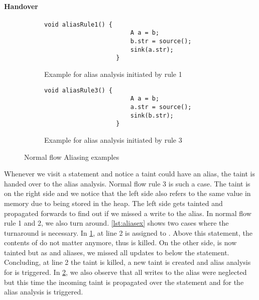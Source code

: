 \documentclass[../draft.tex]{subfiles}
\begin{document}
    \paragraph{Handover}
    \begin{figure}[ht]
        \centering
        \begin{subfigure}[b]{0.45\textwidth}
            \centering
            \begin{adjustbox}{max width=\columnwidth}
                \begin{lstlisting}[gobble=20]
                    void aliasRule1() {
                        A a = b;
                        b.str = source();
                        sink(a.str);
                    }
                \end{lstlisting}
            \end{adjustbox}
            \caption{Example for alias analysis initiated by rule 1}
            \label{lst:aliasex_a}
        \end{subfigure}
        \hfill
        \begin{subfigure}[b]{0.45\textwidth}
            \centering
            \begin{adjustbox}{max width=\columnwidth}
                \begin{lstlisting}[gobble=20]
                    void aliasRule3() {
                        A a = b;
                        a.str = source();
                        sink(b.str);
                    }
                \end{lstlisting}
            \end{adjustbox}
            \caption{Example for alias analysis initiated by rule 3}
            \label{lst:aliasex_b}
        \end{subfigure}
        \caption{Normal flow Aliasing examples}
        \label{lst:aliasex}
    \end{figure}
    Whenever we visit a statement and notice a taint could have an alias, the taint is handed over to the alias analysis. 
    Normal flow rule 3 is such a case. The taint is on the right side and we notice that the left side also refers to the same value in memory due to being stored in the heap. The left side gets tainted and propagated forwards to find out if we missed a write to the alias.
    In normal flow rule 1 and 2, we also turn around. \autoref{lst:aliasex} shows two cases where the turnaround is necessary. In \ref{lst:aliasex_a}, at line 2  is assigned to . Above this statement, the contents of  do not matter anymore, thus  is killed. On the other side,  is now tainted but as  and  aliases, we missed all updates to  below the statement. Concluding, at line 2 the  taint is killed, a new taint  is created and alias analysis for  is triggered.
    In \ref{lst:aliasex_b}, we also observe that all writes to the alias were neglected but this time the incoming taint is propagated over the statement and for  the alias analysis is triggered.
\end{document}
